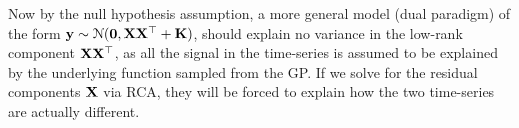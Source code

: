     Now by the null hypothesis assumption,
    a more general model (dual paradigm) of the form $ \mathbf{y} \sim \mathcal{N}(\mathbf{0}, \mathbf{\mathbf{X}\mathbf{X}^\top + \mathbf{K}})$, should explain no variance in the low-rank component $\mathbf{X}\mathbf{X}^\top$,
    as all the signal in the time-series is assumed to be explained by the underlying function sampled from the GP.
    If we solve for the residual components $\mathbf{X}$ via RCA, they will be forced to explain how the two time-series are actually different.
 
